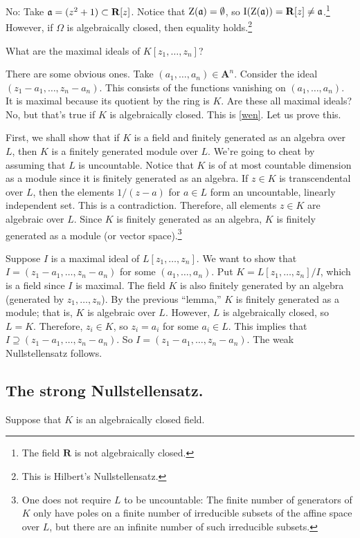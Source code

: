 \documentclass [11 pt, oneside] {article}
\begin{document}
No: Take $\mathfrak{a} = (z^2 + 1) \subset \mathbf R[z]$. Notice that $\operatorname{Z}(\mathfrak{a})= \emptyset$, so $\operatorname{I}(\operatorname{Z}(\mathfrak{a})) = \mathbf{R}[z]\ne \mathfrak{a}$.\footnote{The field $\mathbf{R}$ is not algebraically closed.} However, if $\Omega$ is algebraically closed, then equality holds.\footnote{This is Hilbert's Nullstellensatz.}

\begin{problem}
	What are the maximal ideals of $K[z_1,\hdots, z_n]$?
\end{problem}

There are some obvious ones. Take $(a_1,\hdots, a_n)\in \mathbf{A}^n$. Consider the ideal $(z_1-a_1,\hdots, z_n-a_n)$. This consists of the functions vanishing on $(a_1,\hdots, a_n)$. It is maximal because its quotient by the ring is $K$. Are these all maximal ideals? No, but that's true if $K$ is algebraically closed. This is \cref{wen}. Let us prove this.

First, we shall show that if $K$ is a field and finitely generated as an algebra over $L$, then $K$ is a finitely generated module over $L$. We're going to cheat by assuming that $L$ is uncountable. Notice that $K$ is of at most countable dimension as a module since it is finitely generated as an algebra. If $z\in K$ is transcendental over $L$, then the elements $1/(z-a)$ for $a\in L$ form an uncountable, linearly independent set. This is a contradiction. Therefore, all elements $z\in K$ are algebraic over $L$. Since $K$ is finitely generated as an algebra, $K$ is finitely generated as a module (or vector space).\footnote{One does not require $L$ to be uncountable: The finite number of generators of $K$ only have poles on a finite number of irreducible subsets of the affine space over $L$, but there are an infinite number of such irreducible subsets.}

Suppose $I$ is a maximal ideal of $L[z_1,\hdots, z_n]$. We want to show that $I = (z_1-a_1,\hdots, z_n-a_n)$ for some $(a_1,\hdots, a_n)$. Put $K = L[z_1,\hdots, z_n]/I$, which is a field since $I$ is maximal. The field $K$ is also finitely generated by an algebra (generated by $z_1,\hdots, z_n$). By  the previous ``lemma,'' $K$ is finitely generated as a module; that is, $K$ is algebraic over $L$. However, $L$ is algebraically closed, so $L=K$. Therefore, $z_i\in K$, so $z_i=a_i$ for some $a_i\in L$. This implies that $I\supseteq (z_1-a_1,\hdots, z_n-a_n)$. So $I = (z_1-a_1,\hdots, z_n-a_n)$. The weak Nullstellensatz follows.


\subsection{The strong Nullstellensatz.}
Suppose that $K$ is an algebraically closed field.
\end{document}
